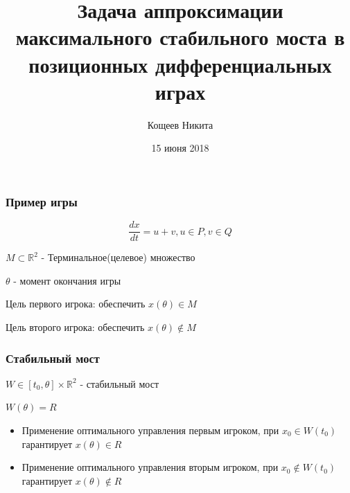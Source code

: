 \documentclass{beamer}
\title[Аппроксимация стабильного моста]{Задача аппроксимации максимального стабильного моста в позиционных дифференциальных играх}
\author{Кощеев Никита}
\institute[УрФУ]{Институт естественных наук и математики}
\date{15 июня 2018}
\newcommand{\dimension}{\mathbb{R}^2}
\begin{document}
  
  \begin{frame}
      
    \titlepage 
    
  \end{frame}
  
  
  
  \begin{frame}
    \frametitle{Пример игры}
  
    \begin{equation}
        \frac{dx}{dt} = u + v, u \in P, v \in Q
    \end{equation}

    $M \subset \dimension$ - Терминальное(целевое) множество 
    \vspace{5mm}
  
    $\theta$ - момент окончания игры

    Цель первого игрока: обеспечить $x(\theta) \in M$

    Цель второго игрока: обеспечить $x(\theta) \notin M$

  \end{frame}

  


  \begin{frame}
    \frametitle{Стабильный мост}

    $W \in [t_0, \theta] \times \dimension$ - стабильный мост

    $W(\theta)=R$

    \begin{itemize}
      \item Применение оптимального управления первым игроком,
      при $x_0 \in W(t_0)$ гарантирует $x(\theta) \in R$
      \item Применение оптимального управления вторым игроком,
      при $x_0 \notin W(t_0)$ гарантирует $x(\theta) \notin R$
    \end{itemize}

  \end{frame}
  
  
\end{document}
